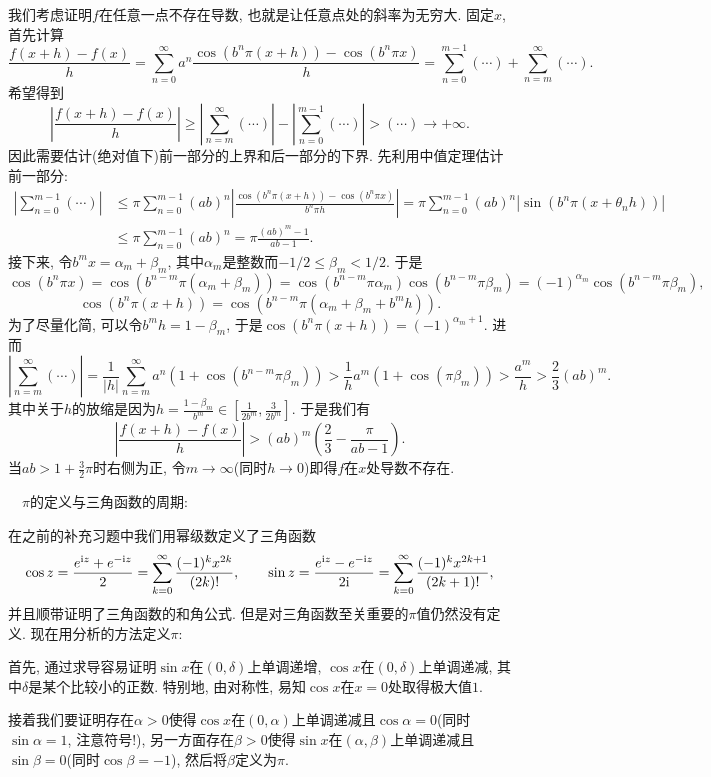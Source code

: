 我们考虑证明$f$在任意一点不存在导数, 也就是让任意点处的斜率为无穷大. 固定$x$, 首先计算$$\frac{f(x+h)-f(x)}{h} = \sum_{n=0}^{\infty} a^n \frac{\cos (b^n\pi (x+h)) - \cos (b^n\pi x)}{h} = \sum_{n=0}^{m-1}(\cdots) + \sum_{n=m}^{\infty}(\cdots).$$
希望得到$$\left| \frac{f(x+h)-f(x)}{h} \right| \geq \left| \sum_{n=m}^{\infty}(\cdots) \right| - \left| \sum_{n=0}^{m-1}(\cdots) \right| > (\cdots ) \to +\infty .$$
因此需要估计(绝对值下)前一部分的上界和后一部分的下界. 先利用中值定理估计前一部分: 
\begin{align*}
	\left| \sum_{n=0}^{m-1}(\cdots) \right| &\leq \pi \sum_{n=0}^{m-1} (ab)^n \left| \frac{\cos (b^n\pi (x+h)) - \cos (b^n\pi x)}{b^n \pi h} \right| = \pi \sum_{n=0}^{m-1} (ab)^n |\sin (b^n\pi (x+\theta _n h))| \\ 
	&\leq \pi \sum_{n=0}^{m-1} (ab)^n = \pi \frac{(ab)^m-1}{ab-1}. 
\end{align*}
接下来, 令$b^mx=\alpha _m+\beta _m$, 其中$\alpha _m$是整数而$-1/2 \leq \beta _m < 1/2$. 于是$$\cos (b^n\pi x) = \cos (b^{n-m}\pi (\alpha _m + \beta _m)) = \cos (b^{n-m}\pi \alpha _m)\cos (b^{n-m}\pi \beta _m) = (-1)^{\alpha _m} \cos (b^{n-m}\pi \beta _m), $$
$$\cos (b^n\pi (x+h)) = \cos \left( b^{n-m}\pi(\alpha _m + \beta _m + b^mh) \right). $$
为了尽量化简, 可以令$b^mh=1-\beta _m$, 于是$\cos (b^n\pi (x+h)) = (-1)^{\alpha _m+1}$. 进而$$\left| \sum_{n=m}^{\infty}(\cdots) \right| = \frac{1}{|h|} \sum_{n=m}^{\infty} a^n(1+\cos (b^{n-m}\pi \beta _m)) > \frac{1}{h}a^m(1+\cos (\pi \beta _m)) > \frac{a^m}{h} > \frac{2}{3}(ab)^m. $$
其中关于$h$的放缩是因为$h = \frac{1-\beta _m}{b^m} \in [\frac{1}{2b^m},\frac{3}{2b^m}]$. 于是我们有$$\left| \frac{f(x+h)-f(x)}{h} \right| > (ab)^m \left( \frac{2}{3}-\frac{\pi}{ab-1} \right).$$
当$ab>1+\frac{3}{2}\pi$时右侧为正, 令$m \to \infty$(同时$h \to 0$)即得$f$在$x$处导数不存在. 


~~$\pi$的定义与三角函数的周期: 

在之前的补充习题中我们用幂级数定义了三角函数$$\cos z = \frac{e^{\mathrm{i} z}+e^{-\mathrm{i} z}}{2}= \sum_{k=0}^{\infty} \frac{(-1)^kx^{2k}}{(2k)!},\qquad \sin z = \frac{e^{\mathrm{i} z} - e^{-\mathrm{i} z}}{2\mathrm{i}} = \sum_{k=0}^{\infty} \frac{(-1)^kx^{2k+1}}{(2k+1)!}, $$
并且顺带证明了三角函数的和角公式. 但是对三角函数至关重要的$\pi$值仍然没有定义. 现在用分析的方法定义$\pi$: 

首先, 通过求导容易证明$\sin x$在$(0,\delta)$上单调递增, $\cos x$在$(0,\delta)$上单调递减, 其中$\delta$是某个比较小的正数. 特别地, 由对称性, 易知$\cos x$在$x=0$处取得极大值$1$. 

接着我们要证明存在$\alpha >0$使得$\cos x$在$(0,\alpha)$上单调递减且$\cos \alpha =0$(同时$\sin \alpha =1$, 注意符号!), 另一方面存在$\beta >0$使得$\sin x$在$(\alpha ,\beta)$上单调递减且$\sin \beta =0$(同时$\cos \beta = -1$), 然后将$\beta$定义为$\pi$. 

